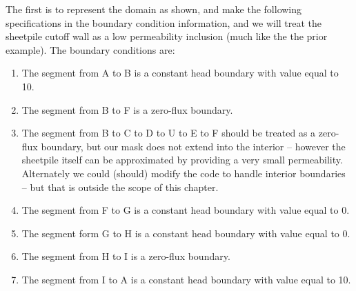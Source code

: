 The first is to represent the domain as shown, and make the following specifications in the boundary condition information, and we will treat the sheetpile cutoff wall as a low permeability inclusion (much like the the prior example).
The boundary conditions are:
\begin{enumerate}
\item The segment from A to B is a constant head boundary with value equal to 10.
\item The segment from B to F is a zero-flux boundary.
\item The segment from B to C to D to U to E to F should be treated as a zero-flux boundary, but our mask does not extend into the interior -- however the sheetpile itself can be approximated by providing a very small permeability.   Alternately we could (should) modify the code to handle interior boundaries -- but that is outside the scope of this chapter.
\item The segment from F to G is a constant head boundary with value equal to 0.
\item The segment form G to H is a constant head boundary with value equal to 0.
\item The segment from H to I is a zero-flux boundary.
\item The segment from I to A is a constant head boundary with value equal to 10.
\end{enumerate}

